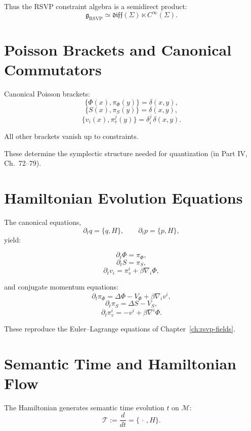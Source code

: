 Thus the RSVP constraint algebra is a semidirect product:
\[
\mathfrak{g}_\mathrm{RSVP}
     \simeq \mathfrak{diff}(\Sigma) \ltimes C^\infty(\Sigma).
\]

\section{Poisson Brackets and Canonical Commutators}

Canonical Poisson brackets:
\[
\{\Phi(x), \pi_\Phi(y)\}
   = \delta(x,y),
\]
\[
\{S(x), \pi_S(y)\}
   = \delta(x,y),
\]
\[
\{v_i(x), \pi^j_v(y)\}
   = \delta_i^j\,\delta(x,y).
\]

All other brackets vanish up to constraints.

These determine the symplectic structure needed for quantization
(in Part IV, Ch.~72–79).

\section{Hamiltonian Evolution Equations}

The canonical equations,
\[
\partial_t q = \{q, H\}, \qquad \partial_t p = \{p, H\},
\]
yield:

\[
\partial_t \Phi = \pi_\Phi,
\]
\[
\partial_t S = \pi_S,
\]
\[
\partial_t v_i = \pi^i_v + \beta \nabla_i \Phi,
\]

and conjugate momentum equations:
\[
\partial_t \pi_\Phi
 = \Delta \Phi - V_\Phi + \beta \nabla_i v^i,
\]
\[
\partial_t \pi_S
 = \Delta S - V_S,
\]
\[
\partial_t \pi^i_v
 = - v^i + \beta \nabla^i \Phi.
\]

These reproduce the Euler–Lagrange equations of Chapter~\ref{ch:rsvp-fields}.

\section{Semantic Time and Hamiltonian Flow}

The Hamiltonian generates semantic time evolution $t$ on $\mathcal{M}$:
\[
\mathcal{T} := \frac{d}{dt} = \{\,\cdot\,,H\}.
\]


